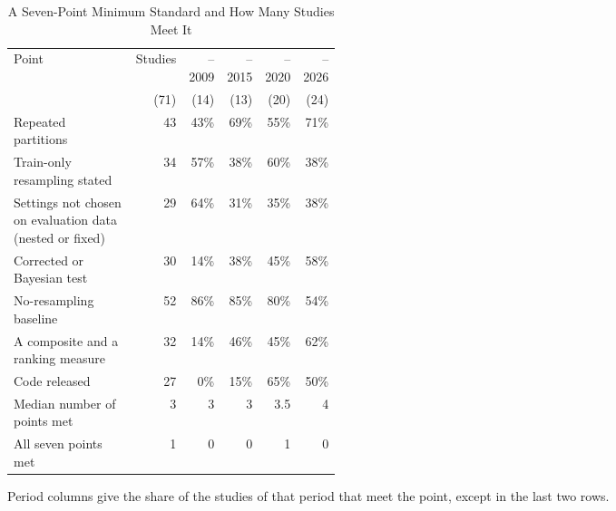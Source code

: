 \begin{table}[t]
  \caption{A Seven-Point Minimum Standard and How Many Studies Meet It}
  \label{tab:empirical-standard}
  \footnotesize
  \setlength{\tabcolsep}{4pt}
  \begin{tabular}{@{}>{\raggedright\arraybackslash}p{0.42\linewidth}rrrrr@{}}
    \toprule
    Point & Studies & --2009 & --2015 & --2020 & --2026\\
    & (71) & (14) & (13) & (20) & (24)\\
    \midrule
    Repeated partitions & 43 & 43\% & 69\% & 55\% & 71\%\\
    Train-only resampling stated & 34 & 57\% & 38\% & 60\% & 38\%\\
    Settings not chosen on evaluation data (nested or fixed) & 29 & 64\% & 31\% & 35\% & 38\%\\
    Corrected or Bayesian test & 30 & 14\% & 38\% & 45\% & 58\%\\
    No-resampling baseline & 52 & 86\% & 85\% & 80\% & 54\%\\
    A composite and a ranking measure & 32 & 14\% & 46\% & 45\% & 62\%\\
    Code released & 27 & 0\% & 15\% & 65\% & 50\%\\
    \midrule
    Median number of points met & 3 & 3 & 3 & 3.5 & 4\\
    All seven points met & 1 & 0 & 0 & 1 & 0\\
    \bottomrule
  \end{tabular}
  \par\smallskip\raggedright\scriptsize Period columns give the share of the studies of that period that meet the point, except in the last two rows.
\end{table}
